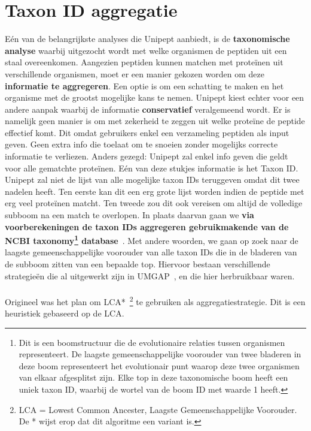 \section{Taxon ID aggregatie}\label{sec:taxon-id-aggregatie}
Eén van de belangrijkste analyses die Unipept aanbiedt, is de \textbf{taxonomische analyse} waarbij uitgezocht wordt met welke organismen de peptiden uit een staal overeenkomen.
Aangezien peptiden kunnen matchen met proteïnen uit verschillende organismen, moet er een manier gekozen worden om deze \textbf{informatie te aggregeren}.
Een optie is om een schatting te maken en het organisme met de grootst mogelijke kans te nemen.
Unipept kiest echter voor een andere aanpak waarbij de informatie \textbf{conservatief} veralgemeend wordt.
Er is namelijk geen manier is om met zekerheid te zeggen uit welke proteïne de peptide effectief komt.
Dit omdat gebruikers enkel een verzameling peptiden als input geven.
Geen extra info die toelaat om te snoeien zonder mogelijks correcte informatie te verliezen.
Anders gezegd: Unipept zal enkel info geven die geldt voor alle gematchte proteïnen.
Eén van deze stukjes informatie is het Taxon ID\@.
Unipept zal niet de lijst van alle mogelijke taxon IDs teruggeven omdat dit twee nadelen heeft.
Ten eerste kan dit een erg grote lijst worden indien de peptide met erg veel proteïnen matcht.
Ten tweede zou dit ook vereisen om altijd de volledige subboom na een match te overlopen.
In plaats daarvan gaan we \textbf{via voorberekeningen de taxon IDs aggregeren gebruikmakende van de NCBI taxonomy\footnote{Dit is een boomstructuur die de evolutionaire relaties tussen organismen representeert. De laagste gemeenschappelijke voorouder van twee bladeren in deze boom representeert het evolutionair punt waarop deze twee organismen van elkaar afgesplitst zijn. Elke top in deze taxonomische boom heeft een uniek taxon ID, waarbij de wortel van de boom ID met waarde 1 heeft.} database}~\cite{NCBI_original_article, NCBI_update}.
Met andere woorden, we gaan op zoek naar de laagste gemeenschappelijke voorouder van alle taxon IDs die in de bladeren van de subboom zitten van een bepaalde top.
Hiervoor bestaan verschillende strategieën die al uitgewerkt zijn in UMGAP~\cite{UMGAP_paper, UMGAP_source}, en die hier herbruikbaar waren.
\\ \\
Origineel was het plan om LCA*~\footnote{LCA = Lowest Common Ancester, Laagste Gemeenschappelijke Voorouder. De * wijst erop dat dit algoritme een variant is.} te gebruiken als aggregatiestrategie.
Dit is een heuristiek gebaseerd op de LCA.

